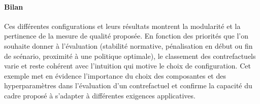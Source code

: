 \paragraph{Bilan}

\hfill

Ces différentes configurations et leurs résultats montrent la modularité et la pertinence de la mesure de qualité proposée. En fonction des priorités que l'on souhaite donner à l'évaluation (stabilité normative, pénalisation en début ou fin de scénario, proximité à une politique optimale), le classement des contrefactuels varie et reste cohérent avec l'intuition qui motive le choix de configuration. Cet exemple met en évidence l'importance du choix des composantes et des hyperparamètres dans l'évaluation d'un contrefactuel et confirme la capacité du cadre proposé à s'adapter à différentes exigences applicatives.



